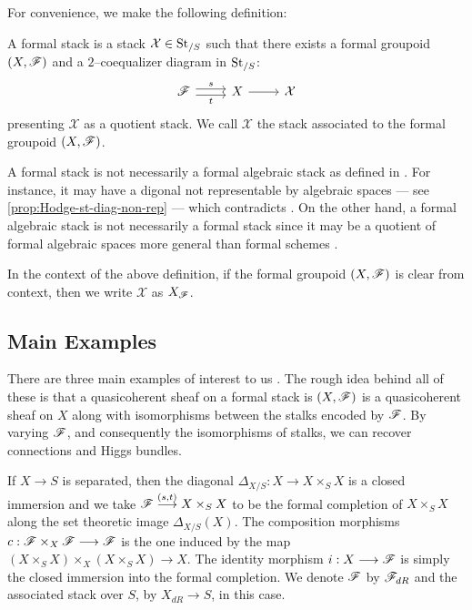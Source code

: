 \documentclass[11pt]{amsart}
\begin{document}
For convenience, we make the following definition:
\begin{defn}
\label{defn:form-st}
A formal stack is a stack $\mathcal{X} \in \mathrm{St}_{/S}$ such that there exists
a formal groupoid $(X, \mathscr{F})$ and a $2$--coequalizer diagram in $\mathrm{St}_{/S}$:
\[\begin{tikzcd}
\sF \ar[r, shift left, "s"] \ar[r, shift right, "t" below] &
X \ar[r] &
\mathcal{X}
\end{tikzcd}\]
presenting $\mathcal{X}$ as a quotient stack.
We call $\mathcal{X}$ the stack associated to the formal groupoid
$(X, \mathscr{F})$.
\end{defn}

\begin{warn}
A formal stack is not necessarily a formal algebraic stack as defined in
\cite[Definition 5.3]{FormalAlgSt}. For instance, it may have a digonal
not representable by algebraic spaces --- see \cref{prop:Hodge-st-diag-non-rep}
--- which contradicts \cite[Lemma 5.12.]{FormalAlgSt}.
On the other hand, a formal algebraic stack is not necessarily a formal stack
since it may be a quotient of formal algebraic spaces more general than formal
schemes \cite[47]{FormalAlgSt}.
\end{warn}

\begin{notn}
In the context of the above definition, if the formal groupoid $(X, \mathscr{F})$
is clear from context, then we write $\mathcal{X}$ as $X_\mathscr{F}$.
\end{notn}

\subsection{Main Examples}

There are three main examples of interest to us \cite[31---33]{NonAbHodgeFilt}.
The rough idea behind all of these is that a quasicoherent sheaf on
a formal stack is $(X, \mathscr{F})$ is a quasicoherent sheaf on $X$ along with
isomorphisms between the stalks encoded by $\mathscr{F}$. By varying $\mathscr{F}$,
and consequently the isomorphisms of stalks, we can recover connections and
Higgs bundles.

\begin{exm}
\label{exm:dR-st}
If $X \to S$ is separated, then the diagonal $\Delta_{X/S} : X \to X \times_S X$
is a closed immersion and we take $\sF \to[{(s, t)}] X \times_S X$ to be the
formal completion of $X \times_S X$ along the set theoretic image
$\Delta_{X/S}(X)$. The composition morphisms $c : \sF \times_X \sF \to \sF$
is the one induced by the map 
$(X \times_S X) \times_X (X \times_S X) \to X$.
The identity morphism $i : X \to \sF$
is simply the closed immersion into the formal completion.
We denote $\mathscr{F}$ by $\mathscr{F}_{dR}$ and the associated stack over $S$, by
$X_{dR} \to S$, in this case.
\end{exm}
\end{document}
